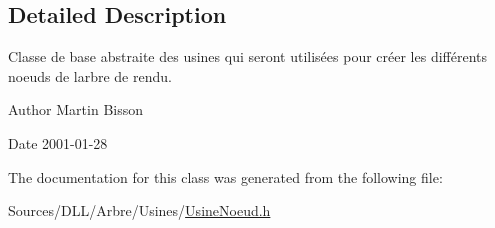 \subsection{Detailed Description}
Classe de base abstraite des usines qui seront utilisées pour créer les différents noeuds de l\textquotesingle{}arbre de rendu. 

\begin{DoxyAuthor}{Author}
Martin Bisson 
\end{DoxyAuthor}
\begin{DoxyDate}{Date}
2001-\/01-\/28 
\end{DoxyDate}


The documentation for this class was generated from the following file\+:\begin{DoxyCompactItemize}
\item 
Sources/\+D\+L\+L/\+Arbre/\+Usines/\hyperlink{_usine_noeud_8h}{Usine\+Noeud.\+h}\end{DoxyCompactItemize}
